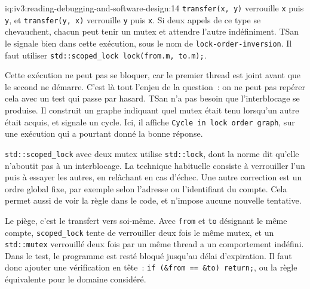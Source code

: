 \begin{solution}{iq:iv3:reading-debugging-and-software-design:14}
\texttt{transfer(x, y)} verrouille \texttt{x} puis \texttt{y}, et \texttt{transfer(y, x)} verrouille \texttt{y} puis \texttt{x}. Si deux appels de ce type se chevauchent, chacun peut tenir un mutex et attendre l'autre indéfiniment. TSan le signale bien dans cette exécution, sous le nom de \texttt{lock-order-inversion}. Il faut utiliser \texttt{std::scoped\_lock lock(from.m, to.m);}.

Cette exécution ne peut pas se bloquer, car le premier thread est joint avant que le second ne démarre. C'est là tout l'enjeu de la question~: on ne peut pas repérer cela avec un test qui passe par hasard. TSan n'a pas besoin que l'interblocage se produise. Il construit un graphe indiquant quel mutex était tenu lorsqu'un autre était acquis, et signale un cycle. Ici, il affiche \texttt{Cycle in lock order graph}, sur une exécution qui a pourtant donné la bonne réponse.

\texttt{std::scoped\_lock} avec deux mutex utilise \texttt{std::lock}, dont la norme dit qu'elle n'aboutit pas à un interblocage. La technique habituelle consiste à verrouiller l'un puis à essayer les autres, en relâchant en cas d'échec. Une autre correction est un ordre global fixe, par exemple selon l'adresse ou l'identifiant du compte. Cela permet aussi de voir la règle dans le code, et n'impose aucune nouvelle tentative.

Le piège, c'est le transfert vers soi-même. Avec \texttt{from} et \texttt{to} désignant le même compte, \texttt{scoped\_lock} tente de verrouiller deux fois le même mutex, et un \texttt{std::mutex} verrouillé deux fois par un même thread a un comportement indéfini. Dans le test, le programme est resté bloqué jusqu'au délai d'expiration. Il faut donc ajouter une vérification en tête~: \texttt{if (\&from == \&to) return;}, ou la règle équivalente pour le domaine considéré.


\end{solution}

